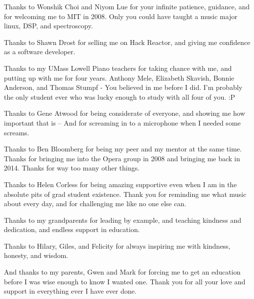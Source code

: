 \documentclass{tufte-book}
\begin{document}
Thanks to Wonshik Choi and Niyom Lue for your infinite patience,
guidance, and for welcoming me to MIT in 2008. Only you could have
taught a music major linux, DSP, and spectroscopy.

Thanks to Shawn Drost for selling me on Hack Reactor, and giving me
confidence as a software developer. 

Thanks to my UMass Lowell Piano teachers for taking chance with me,
and putting up with me for four years. Anthony Mele, Elizabeth
Skavish, Bonnie Anderson, and Thomas Stumpf - You believed in me
before I did. I'm probably the only student ever who was lucky enough
to study with all four of you. :P

Thanks to Gene Atwood for being considerate of everyone, and showing
me how important that is -- And for screaming in to a microphone when
I needed some screams.

Thanks to Ben Bloomberg for being my peer and my mentor at the same
time. Thanks for bringing me into the Opera group in 2008 and bringing
me back in 2014. Thanks for way too many other things. 

Thanks to Helen Corless for being amazing supportive even when I am 
in the absolute pits of grad student existence. Thank you for
reminding me what music about every day, and for challenging me like
no one else can.

Thanks to my grandparents for leading by example, and teaching
kindness and dedication, and endless support in education.

Thanks to Hilary, Giles, and Felicity for always inspiring me with
kindness, honesty, and wisdom. 

And thanks to my parents, Gwen and Mark for forcing me to get an
education before I was wise enough to know I wanted one. Thank you for
all your love and support in everything ever I have ever done.



\end{document}
